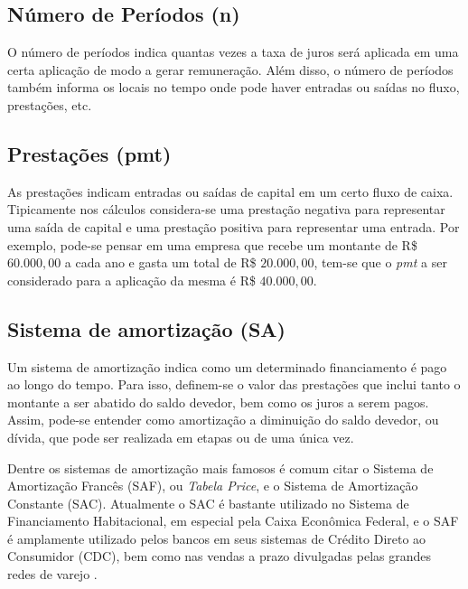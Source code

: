 \subsection{Número de Períodos (n)}

O número de períodos indica quantas vezes a taxa de juros será aplicada em uma certa aplicação de modo a gerar remuneração. Além disso, o número de períodos também informa os locais no tempo onde pode haver entradas ou saídas no fluxo, prestações, etc.

\subsection{Prestações (pmt)}

As prestações indicam entradas ou saídas de capital em um certo fluxo de caixa. Tipicamente nos cálculos considera-se uma prestação negativa para representar uma saída de capital e uma prestação positiva para representar uma entrada. Por exemplo, pode-se pensar em uma empresa que recebe um montante de R\$ $60.000,00$ a cada ano e gasta um total de R\$ $20.000,00$, tem-se que o \textit{pmt} a ser considerado para a aplicação da mesma é R\$ $40.000,00$.


\subsection{Sistema de amortização (SA)}

Um sistema de amortização indica como um determinado financiamento é pago ao longo do tempo. Para isso, definem-se o valor das prestações que inclui tanto o montante a ser abatido do saldo devedor, bem como os juros a serem pagos. Assim, pode-se entender como amortização a diminuição do saldo devedor, ou dívida, que pode ser realizada em etapas ou de uma única vez.

Dentre os sistemas de amortização mais famosos é comum citar o Sistema de Amortização Francês (SAF), ou \textit{Tabela Price}, e o Sistema de Amortização Constante (SAC). Atualmente o SAC é bastante utilizado no Sistema de Financiamento Habitacional, em especial pela Caixa Econômica Federal, e o SAF é amplamente utilizado pelos bancos em seus sistemas de Crédito Direto ao Consumidor (CDC), bem como nas vendas a prazo divulgadas pelas grandes redes de varejo \cite{usoSACSAF}.

